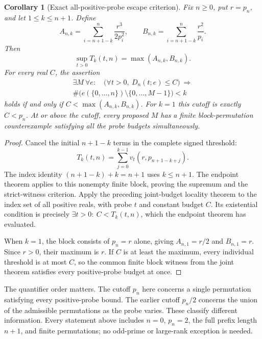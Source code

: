 \documentclass[11pt]{article}
\newtheorem{corollary}[theorem]{Corollary}
\theoremstyle{definition}
\begin{document}
\begin{corollary}[Exact all-positive-probe escape criterion]
Fix $n\ge0$, put $r=p_n$, and let $1\le k\le n+1$. Define
\[
 A_{n,k}=\sum_{i=n+1-k}^{n}\frac{r^3}{2p_i^2},
 \qquad
 B_{n,k}=\sum_{i=n+1-k}^{n}\frac{r^2}{p_i}.
\]
Then
\[
 \sup_{t>0}T_k(t,n)=\max(A_{n,k},B_{n,k}).
\]
For every real $C$, the assertion
\[
 \begin{gathered}
 \exists M\ \forall e:\quad
   \bigl(\forall t>0,\ D_n(t;e)\le C\bigr)
      \ \Longrightarrow\\
 \#\bigl(e(\{0,\ldots,n\})\setminus\{0,\ldots,M-1\}\bigr)<k
 \end{gathered}
\]
holds if and only if $C<\max(A_{n,k},B_{n,k})$.
For $k=1$ this cutoff is exactly $C<p_n$.
At or above the cutoff, every proposed $M$ has a finite
block-permutation counterexample satisfying all the probe budgets
simultaneously.
\end{corollary}

\begin{proof}
Cancel the initial $n+1-k$ terms in the complete signed threshold:
\[
 T_k(t,n)
   =\sum_{j=0}^{k-1}v_t(r,p_{n+1-k+j}).
\]
The index identity $(n+1-k)+k=n+1$ uses $k\le n+1$.
The endpoint theorem applies to this nonempty finite block,
proving the supremum and the strict-witness criterion.
Apply the preceding joint-budget locality theorem to the
index set of all positive reals, with probe $t$ and constant
budget $C$. Its existential condition is precisely
$\exists t>0:\ C<T_k(t,n)$, which the endpoint theorem has
evaluated.

When $k=1$, the block consists of $p_n=r$ alone, giving
$A_{n,1}=r/2$ and $B_{n,1}=r$. Since $r>0$, their maximum is
$r$. If $C$ is at least the maximum, every individual threshold
is at most $C$, so the common finite block witness from the joint
theorem satisfies every positive-probe budget at once.
\end{proof}

The quantifier order matters. The cutoff $p_n$ here concerns a
single permutation satisfying every positive-probe bound.
The earlier cutoff $p_n/2$ concerns the union of the admissible
permutations as the probe varies. These classify different
information. Every statement above includes $n=0$, $p_n=2$,
the full prefix length $n+1$, and finite permutations; no odd-prime
or large-rank exception is needed.
\end{document}
